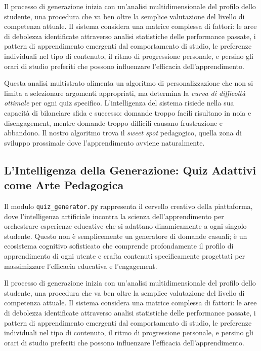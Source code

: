 \documentclass[a4paper, 14pt, oneside]{extbook}
\begin{document}
Il processo di generazione inizia con un'analisi multidimensionale del profilo dello studente, una procedura che va ben oltre la semplice valutazione del livello di competenza attuale. Il sistema considera una matrice complessa di fattori: le aree di debolezza identificate attraverso analisi statistiche delle performance passate, i pattern di apprendimento emergenti dal comportamento di studio, le preferenze individuali nel tipo di contenuto, il ritmo di progressione personale, e persino gli orari di studio preferiti che possono influenzare l'efficacia dell'apprendimento.

Questa analisi multistrato alimenta un algoritmo di personalizzazione che non si limita a selezionare argomenti appropriati, ma determina la \textit{curva di difficoltà ottimale} per ogni quiz specifico. L'intelligenza del sistema risiede nella sua capacità di bilanciare sfida e successo: domande troppo facili risultano in noia e disengagement, mentre domande troppo difficili causano frustrazione e abbandono. Il nostro algoritmo trova il \textit{sweet spot} pedagogico, quella zona di sviluppo prossimale dove l'apprendimento avviene naturalmente.

\subsection{L'Intelligenza della Generazione: Quiz Adattivi come Arte Pedagogica}

Il modulo \texttt{quiz\_generator.py} rappresenta il cervello creativo della piattaforma, dove l'intelligenza artificiale incontra la scienza dell'apprendimento per orchestrare esperienze educative che si adattano dinamicamente a ogni singolo studente. Questo non è semplicemente un generatore di domande casuali; è un ecosistema cognitivo sofisticato che comprende profondamente il profilo di apprendimento di ogni utente e crafta contenuti specificamente progettati per massimizzare l'efficacia educativa e l'engagement.

Il processo di generazione inizia con un'analisi multidimensionale del profilo dello studente, una procedura che va ben oltre la semplice valutazione del livello di competenza attuale. Il sistema considera una matrice complessa di fattori: le aree di debolezza identificate attraverso analisi statistiche delle performance passate, i pattern di apprendimento emergenti dal comportamento di studio, le preferenze individuali nel tipo di contenuto, il ritmo di progressione personale, e persino gli orari di studio preferiti che possono influenzare l'efficacia dell'apprendimento.
\end{document}
